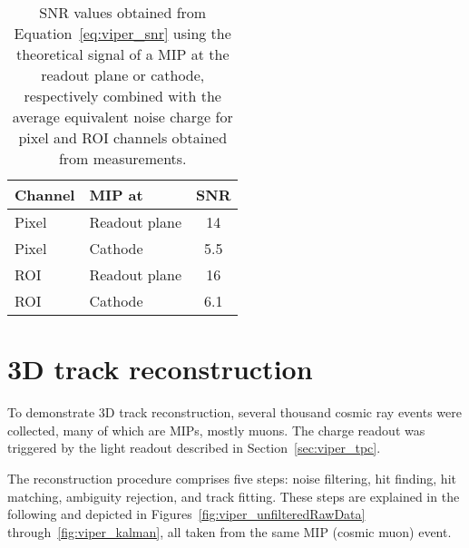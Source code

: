 \begin{table}[htb]
	\centering
	\caption{SNR values obtained from Equation~\eqref{eq:viper_snr} using the theoretical signal of a MIP at the readout plane or cathode, respectively combined with the average equivalent noise charge for pixel and ROI channels obtained from measurements.}
	\label{tab:viper_snr}
	\begin{tabu} to \textwidth {|l|l|S|}
		\hline
		{Channel} &	{MIP at} &			{SNR} \\
		\hline
		\hline
		{Pixel} &	{Readout plane} &	\num{14} \\
		\hline
		{Pixel} &	{Cathode} &			\num{5.5} \\
		\hline
		{ROI} &		{Readout plane} &	\num{16} \\
		\hline
		{ROI} &		{Cathode} &			\num{6.1} \\
		\hline
	\end{tabu}
\end{table}


\section{3D track reconstruction}
\label{sec:viper_reco}


To demonstrate 3D track reconstruction, several thousand cosmic ray events were collected, many of which are MIPs, mostly muons.
The charge readout was triggered by the light readout described in Section~\ref{sec:viper_tpc}.

The reconstruction procedure comprises five steps: noise filtering, hit finding, hit matching, ambiguity rejection, and track fitting.
These steps are explained in the following and depicted in Figures~\ref{fig:viper_unfilteredRawData} through~\ref{fig:viper_kalman}, all taken from the same MIP (cosmic muon) event.

